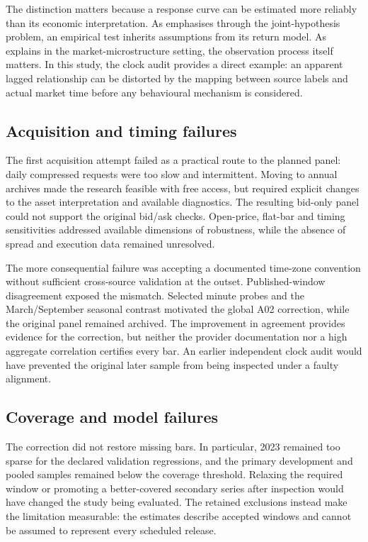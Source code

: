 The distinction matters because a response curve can be estimated more reliably than its economic interpretation. As  emphasises through the joint-hypothesis problem, an empirical test inherits assumptions from its return model. As  explains in the market-microstructure setting, the observation process itself matters. In this study, the clock audit provides a direct example: an apparent lagged relationship can be distorted by the mapping between source labels and actual market time before any behavioural mechanism is considered.

\subsection{Acquisition and timing failures}
The first acquisition attempt failed as a practical route to the planned panel: daily compressed requests were too slow and intermittent. Moving to annual archives made the research feasible with free access, but required explicit changes to the asset interpretation and available diagnostics. The resulting bid-only panel could not support the original bid/ask checks. Open-price, flat-bar and timing sensitivities addressed available dimensions of robustness, while the absence of spread and execution data remained unresolved.

The more consequential failure was accepting a documented time-zone convention without sufficient cross-source validation at the outset. Published-window disagreement exposed the mismatch. Selected minute probes and the March/September seasonal contrast motivated the global A02 correction, while the original panel remained archived. The improvement in agreement provides evidence for the correction, but neither the provider documentation nor a high aggregate correlation certifies every bar. An earlier independent clock audit would have prevented the original later sample from being inspected under a faulty alignment.

\subsection{Coverage and model failures}
The correction did not restore missing bars. In particular, 2023 remained too sparse for the declared validation regressions, and the primary development and pooled samples remained below the coverage threshold. Relaxing the required window or promoting a better-covered secondary series after inspection would have changed the study being evaluated. The retained exclusions instead make the limitation measurable: the estimates describe accepted windows and cannot be assumed to represent every scheduled release.

